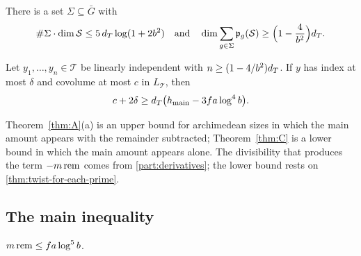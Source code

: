 \begin{mainthm}\label{thm:B}
There is a set $\Sigma\subseteq\bar G$ with
\[
  \#\Sigma\cdot\dim\mathcal S\le5\,d_T\log(1+2b^2)\quad\text{and}\quad
  \dim\sum_{g\in \Sigma}\mathfrak p_g(\mathcal S)\ge\Bigl(1-\frac4{b^2}\Bigr)d_T.
\]
\end{mainthm}

\begin{mainthm}\label{thm:C}
Let $y_1,\dots,y_n\in\mathcal T$ be linearly independent with $n\ge(1-4/b^2)d_T$. If $y$ has index
at most $\delta$ and covolume at most $c$ in $L_{\mathcal T}$, then
\[
  c+2\delta\ge d_T\bigl(h_{\mathrm{main}}-3fa\log^4b\bigr).
\]
\end{mainthm}

Theorem~\ref{thm:A}(a) is an upper bound for archimedean sizes in which the main amount appears with
the remainder subtracted; Theorem~\ref{thm:C} is a lower bound in which the main amount appears alone.
The divisibility that produces the term $-m\,\mathrm{rem}$ comes from \cref{part:derivatives}; the lower bound
rests on \cref{thm:twist-for-each-prime}.

\subsection{The main inequality}\label{ss:main-inequality}

\begin{theorem}\label{thm:main-inequality}
$m\,\mathrm{rem}\le fa\log^5b$.
\end{theorem}

